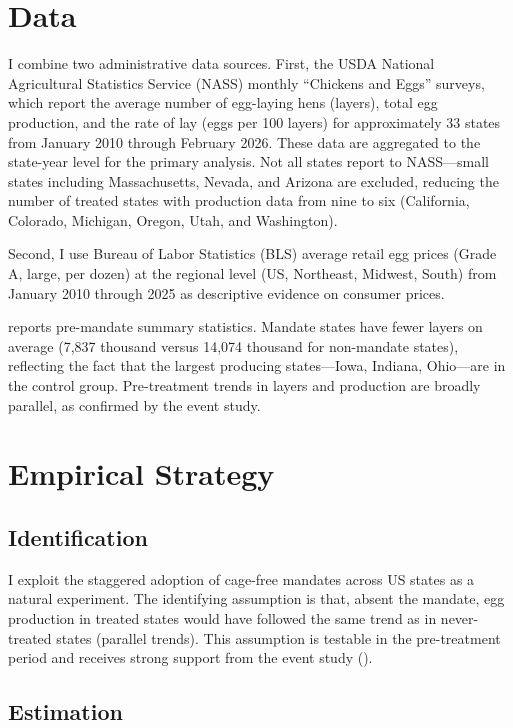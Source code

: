 \documentclass[12pt]{article}
\begin{document}
\section{Data}

I combine two administrative data sources. First, the USDA National Agricultural Statistics Service (NASS) monthly ``Chickens and Eggs'' surveys, which report the average number of egg-laying hens (layers), total egg production, and the rate of lay (eggs per 100 layers) for approximately 33 states from January 2010 through February 2026. These data are aggregated to the state-year level for the primary analysis. Not all states report to NASS---small states including Massachusetts, Nevada, and Arizona are excluded, reducing the number of treated states with production data from nine to six (California, Colorado, Michigan, Oregon, Utah, and Washington).

Second, I use Bureau of Labor Statistics (BLS) average retail egg prices (Grade A, large, per dozen) at the regional level (US, Northeast, Midwest, South) from January 2010 through 2025 as descriptive evidence on consumer prices.

 reports pre-mandate summary statistics. Mandate states have fewer layers on average (7,837 thousand versus 14,074 thousand for non-mandate states), reflecting the fact that the largest producing states---Iowa, Indiana, Ohio---are in the control group. Pre-treatment trends in layers and production are broadly parallel, as confirmed by the event study.




\section{Empirical Strategy}

\subsection{Identification}

I exploit the staggered adoption of cage-free mandates across US states as a natural experiment. The identifying assumption is that, absent the mandate, egg production in treated states would have followed the same trend as in never-treated states (parallel trends). This assumption is testable in the pre-treatment period and receives strong support from the event study ().

\subsection{Estimation}
\end{document}
